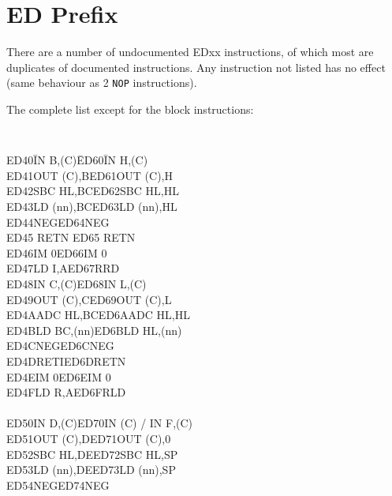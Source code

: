 \documentclass[oneside,a4paper]{book}
\begin{document}
\section{ED Prefix \cite{gerton}}

There are a number of undocumented EDxx instructions, of which most are
duplicates of documented instructions. Any instruction not listed has
no effect (same behaviour as 2 {\tt NOP} instructions).

The complete list except for the block instructions:

\renewcommand{\thefootnote}{\fnsymbol{footnote}}
{}
{\tt
\begin{tabbing}
{\qquad}ED40\quad\=IN B,(C)\qquad\qquad\=ED60\quad\=IN H,(C)\\ 
{\qquad}ED41\>OUT (C),B\>ED61\>OUT (C),H\\ 
{\qquad}ED42\>SBC HL,BC\>ED62\>SBC HL,HL\\  
{\qquad}ED43\>LD (nn),BC\>ED63\>LD (nn),HL\\ 
{\qquad}ED44\>NEG\>ED64\>NEG{\footnotemark[7]}\\ 
{\qquad}ED45 \> RETN\> ED65\> RETN{\footnotemark[7]}\\
{\qquad}ED46\>IM 0\>ED66\>IM 0{\footnotemark[7]}\\
{\qquad}ED47\>LD I,A\>ED67\>RRD\\
{\qquad}ED48\>IN C,(C)\>ED68\>IN L,(C)\\
{\qquad}ED49\>OUT (C),C\>ED69\>OUT (C),L\\
{\qquad}ED4A\>ADC HL,BC\>ED6A\>ADC HL,HL\\
{\qquad}ED4B\>LD BC,(nn)\>ED6B\>LD HL,(nn)\\
{\qquad}ED4C\>NEG{\footnotemark[7]}\>ED6C\>NEG{\footnotemark[7]}\\
{\qquad}ED4D\>RETI\>ED6D\>RETN\footnotemark[7]\\
{\qquad}ED4E\>IM 0{\footnotemark[7]}\>ED6E\>IM 0{\footnotemark[7]}\\
{\qquad}ED4F\>LD R,A\>ED6F\>RLD\\
{\qquad}\\
{\qquad}ED50\>IN D,(C)\>ED70\>IN (C) / IN F,(C){\footnotemark[7]}\\
{\qquad}ED51\>OUT (C),D\>ED71\>OUT (C),0{\footnotemark[7]}\\
{\qquad}ED52\>SBC HL,DE\>ED72\>SBC HL,SP\\
{\qquad}ED53\>LD (nn),DE\>ED73\>LD (nn),SP\\
{\qquad}ED54\>NEG{\footnotemark[7]}\>ED74\>NEG{\footnotemark[7]}\\

\end{tabbing}}
\end{document}
